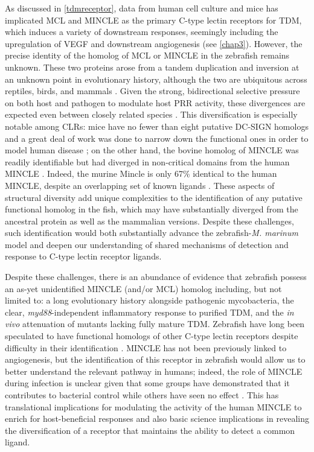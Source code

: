 As discussed in \autoref{tdmreceptor}, data from human cell culture and mice has implicated MCL and MINCLE as the primary C-type lectin receptors for TDM, which induces a variety of downstream responses, seemingly including the upregulation of VEGF and downstream angiogenesis (see \autoref{chap3}). However, the precise identity of the homolog of MCL or MINCLE in the zebrafish remains unknown. These two proteins arose from a tandem duplication and inversion at an unknown point in evolutionary history, although the two are ubiquitous across reptiles, birds, and mammals \citep{Miyake2013, Richardson2014}. Given the strong, bidirectional selective pressure on both host and pathogen to modulate host PRR activity, these divergences are expected even between closely related species \citep{Rambaruth2015}. This diversification is especially notable among CLRs: mice have no fewer than eight putative DC-SIGN homologs and a great deal of work was done to narrow down the functional ones in order to model human disease \citep{GarciaVallejo2013}; on the other hand, the bovine homolog of MINCLE was readily identifiable but had diverged in non-critical domains from the human MINCLE \citep{Feinberg2016, Furukawa2013, Feinberg2013}. Indeed, the murine Mincle is only 67\% identical to the human MINCLE, despite an overlapping set of known ligands \citep{Matsumoto1999}. These aspects of structural diversity add unique complexities to the identification of any putative functional homolog in the fish, which may have substantially diverged from the ancestral protein as well as the mammalian versions. Despite these challenges, such identification would both substantially advance the zebrafish\hyp{}\textit{M. marinum} model and deepen our understanding of shared mechanisms of detection and response to C-type lectin receptor ligands.

Despite these challenges, there is an abundance of evidence that zebrafish possess an as-yet unidentified MINCLE (and/or MCL) homolog including, but not limited to: a long evolutionary history alongside pathogenic mycobacteria, the clear, \textit{myd88}-independent inflammatory response to purified TDM, and the \textit{in vivo} attenuation of mutants lacking fully mature TDM. Zebrafish have long been speculated to have functional homologs of other C-type lectin receptors despite difficulty in their identification \citep{Petit2019}. MINCLE has not been previously linked to angiogenesis, but the identification of this receptor in zebrafish would allow us to better understand the relevant pathway in humans; indeed, the role of MINCLE during infection is unclear given that some groups have demonstrated that it contributes to bacterial control while others have seen no effect \citep{Behler2012, Behler2015, Heitmann2013, Lee2012}. This has translational implications for modulating the activity of the human MINCLE to enrich for host-beneficial responses and also basic science implications in revealing the diversification of a receptor that maintains the ability to detect a common ligand. 

